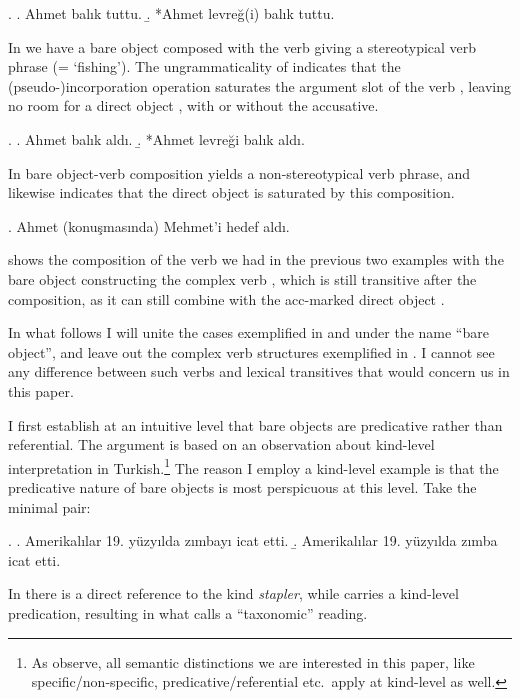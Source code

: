 \documentclass[11pt,a4paper]{article}
\begin{document}
\ex.
\label{exbalik1}
\a. Ahmet balık tuttu.
\b. *Ahmet levreğ(i) balık tuttu.

In  we have a bare object composed with the verb giving a stereotypical verb phrase (= `fishing'). The ungrammaticality of  indicates that the (pseudo-)incorporation operation saturates the argument slot of the verb , leaving no room for a direct object , with or without the accusative.

\ex.\label{exbalik2} 
\a.
Ahmet balık aldı.
\b.
*Ahmet levreği balık aldı.

In  bare object-verb composition yields a non-stereotypical verb phrase, and  likewise indicates that the direct object is saturated by this composition.

\ex.
\label{exbalik3}
Ahmet (konuşmasında) Mehmet'i hedef aldı.

 shows the composition of the verb we had in the previous two examples with the bare object  constructing the complex verb , which is still transitive after the composition, as it can still combine with the acc-marked direct object .

In what follows I will unite the cases exemplified in  and  under the name ``bare object'', and leave out the complex verb structures exemplified in . I cannot see any difference between such verbs and lexical transitives that would concern us in this paper.

I first establish at an intuitive level that bare objects are predicative rather than referential. The argument is based on an observation about kind-level interpretation in Turkish.\footnote{As  observe, all semantic distinctions we are interested in this paper, like specific/non-specific, predicative/referential etc.\ apply at kind-level as well.} The reason I employ a kind-level example is that the predicative nature of bare objects is most perspicuous at this level. Take the minimal pair:

\ex.\label{exzimba}
\a. Amerikalılar 19. yüzyılda  zımbayı icat etti.
\b. Amerikalılar 19. yüzyılda zımba icat etti.

In  there is a direct reference to the kind \emph{stapler}, while  carries a kind-level predication, resulting in what  calls a ``taxonomic'' reading.
\end{document}
